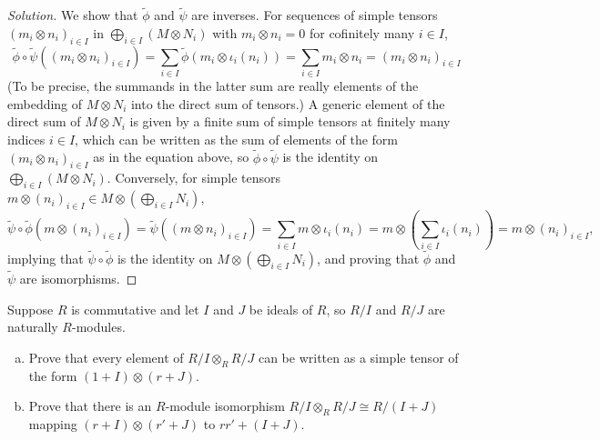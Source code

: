 \documentclass[10pt]{article}
\providecommand{\ii}{\item}
\newenvironment{soln}{\begin{proof}[Solution]}{\end{proof}}
\begin{document}
\begin{soln}
    We show that $\widetilde\phi$ and $\widetilde\psi$ are inverses.
    For sequences of simple tensors
    $(m_i\otimes n_i)_{i\in I}$ in $\bigoplus_{i\in I}(M\otimes N_i)$
    with $m_i\otimes n_i = 0$ for cofinitely many $i\in I$,
    \begin{equation*}
        \widetilde\phi\circ
	\widetilde\psi((m_i\otimes n_i)_{i\in I})
	= \sum_{i\in I}\widetilde\phi(m_i\otimes\iota_i(n_i))
	= \sum_{i\in I} m_i\otimes n_i
	= (m_i\otimes n_i)_{i\in I}
    \end{equation*}
    (To be precise, the summands in the latter sum are really
    elements of the embedding of $M\otimes N_i$ into the direct sum
    of tensors.) A generic element of the direct sum of $M\otimes N_i$
    is given by a finite sum of simple tensors at finitely many indices
    $i\in I$, which can be written as the sum of elements
    of the form $(m_i\otimes n_i)_{i\in I}$ as in the equation above,
    so $\widetilde\phi\circ\widetilde\psi$ is the identity on
    $\bigoplus_{i\in I}(M\otimes N_i)$. Conversely,
    for simple tensors $m\otimes(n_i)_{i\in I}\in M\otimes
    (\bigoplus_{i\in I} N_i)$,
    \begin{equation*}
	\widetilde\psi\circ\widetilde\phi(m\otimes(n_i)_{i\in I})
	= \widetilde\psi((m\otimes n_i)_{i\in I})
	= \sum_{i\in I}m\otimes\iota_i(n_i)
	= m\otimes\left(\sum_{i\in I}\iota_i(n_i)\right)
	= m\otimes(n_i)_{i\in I},
    \end{equation*}
    implying that $\widetilde\psi\circ\widetilde\phi$
    is the identity on $M\otimes(\bigoplus_{i\in I}N_i)$,
    and proving that $\widetilde\phi$ and $\widetilde\psi$
    are isomorphisms.
\end{soln}

\pagebreak
\begin{problem}
    [\S10.4\#16]
    Suppose $R$ is commutative and let $I$ and $J$ be ideals of $R$,
    so $R/I$ and $R/J$ are naturally $R$-modules.
    \begin{enumerate}[(a)]
        \ii Prove that every element of $R/I\otimes_R R/J$
	can be written as a simple tensor of the form
	$(1 + I)\otimes(r + J)$.
	\ii Prove that there is an $R$-module isomorphism
	$R/I\otimes_R R/J\cong R/(I+J)$
	mapping $(r+I)\otimes(r'+J)$ to $rr'+(I+J)$.
    \end{enumerate}
\end{problem}
\end{document}
